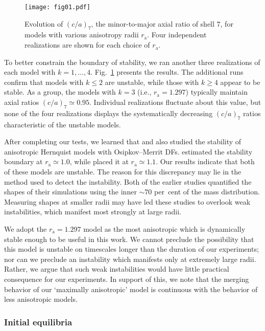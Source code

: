 \documentclass[fleqn,usenatbib]{mnras}
\begin{document}
\begin{figure}
    \centering
    \texttt{[image: fig01.pdf]}
    \caption{Evolution of $(c/a)_{7}$, the minor-to-major axial ratio of shell $7$, for models with various anisotropy radii $r_\mathrm{a}$. Four independent realizations are shown for each choice of $r_\mathrm{a}$.}
    \label{fig01}
\end{figure}

To better constrain the boundary of stability, we ran another three realizations of each model with $k = 1, \dots, 4$. Fig.~\ref{fig01} presents the results. The additional runs confirm that models with $k \le 2$ are unstable, while those with $k \ge 4$ appear to be stable. As a group, the models with $k = 3$ (i.e., $r_\mathrm{a} = 1.297$) typically maintain axial ratios $(c/a)_{7} \simeq 0.95$. Individual realizations fluctuate about this value, but none of the four realizations displays the systematically decreasing $(c/a)_{7}$ ratios characteristic of the unstable models. 

After completing our tests, we learned that \cite{MZ1997} and \cite{Buyle2007} also studied the stability of anisotropic Hernquist models with Osipkov--Merrit DFs. \citeauthor{MZ1997} estimated the stability boundary at $r_\mathrm{a} \simeq 1.0$, while \citeauthor{Buyle2007} placed it at $r_\mathrm{a} \simeq 1.1$. Our results indicate that both of these models are unstable. The reason for this discrepancy may lie in the method used to detect the instability. Both of the earlier studies quantified the shapes of their simulations using the inner $\sim 70$ per~cent of the mass distribution. Measuring shapes at smaller radii may have led these studies to overlook weak instabilities, which manifest most strongly at large radii.

We adopt the $r_\mathrm{a} = 1.297$ model as the most anisotropic which is dynamically stable enough to be useful in this work. We cannot preclude the possibility that this model is unstable on timescales longer than the duration of our experiments; nor can we preclude an instability which manifests only at extremely large radii. Rather, we argue that such weak instabilities would have little practical consequence for our experiments. In support of this, we note that the merging behavior of our `maximally anisotropic' model is continuous with the behavior of less anisotropic models.

\subsubsection{Initial equilibria}
\label{sec:initial_equilibria}
\end{document}
